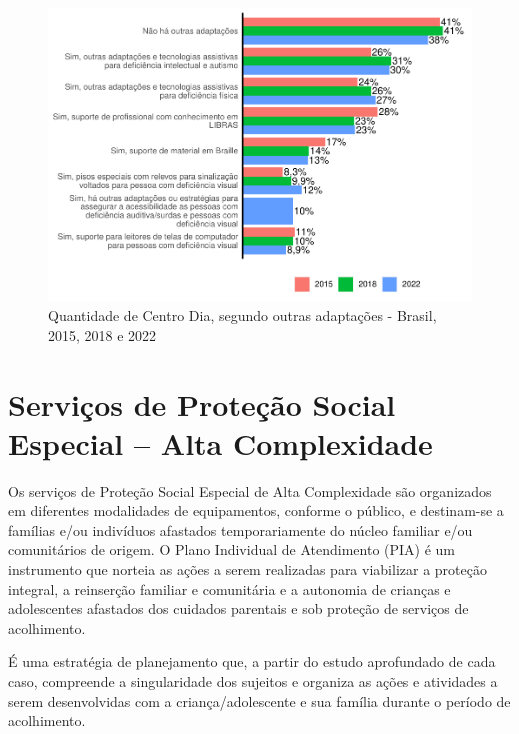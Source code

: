 \documentclass[
  brazilian]{report}
\begin{document}
\begin{figure}
\includegraphics{Censo-SUAS-2022_files/figure-latex/cdia_adaptações-1} \caption[Quantidade de Centro Dia, segundo outras adaptações - Brasil, 2015, 2018 e 2022]{Quantidade de Centro Dia, segundo outras adaptações - Brasil, 2015, 2018 e 2022}\label{fig:cdia_adaptações}
\end{figure}

\hypertarget{serviuxe7os-de-proteuxe7uxe3o-social-especial-alta-complexidade}{%
\section{Serviços de Proteção Social Especial -- Alta
Complexidade}\label{serviuxe7os-de-proteuxe7uxe3o-social-especial-alta-complexidade}}

Os serviços de Proteção Social Especial de Alta Complexidade são
organizados em diferentes modalidades de equipamentos, conforme o
público, e destinam-se a famílias e/ou indivíduos afastados
temporariamente do núcleo familiar e/ou comunitários de origem. O Plano
Individual de Atendimento (PIA) é um instrumento que norteia as ações a
serem realizadas para viabilizar a proteção integral, a reinserção
familiar e comunitária e a autonomia de crianças e adolescentes
afastados dos cuidados parentais e sob proteção de serviços de
acolhimento.

É uma estratégia de planejamento que, a partir do estudo aprofundado de
cada caso, compreende a singularidade dos sujeitos e organiza as ações e
atividades a serem desenvolvidas com a criança/adolescente e sua família
durante o período de acolhimento.
\end{document}
